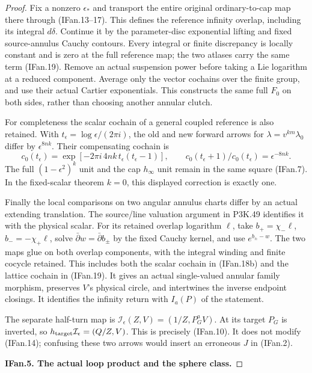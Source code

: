 \begin{proof}
Fix a nonzero \(\epsilon_*\) and transport the entire original
ordinary-to-cap map there through (IFan.13--17). This defines the
reference infinity overlap, including its integral \(d\delta\).
Continue it by the parameter-disc exponential lifting and fixed
source-annulus Cauchy contours. Every integral or finite discrepancy
is locally constant and is zero at the full reference map; the two
atlases carry the same term (IFan.19). Remove an actual suspension
power before taking a Lie logarithm at a reduced component. Average
only the vector cochains over the finite group, and use their actual
Cartier exponentials. This constructs the same full \(F_0\) on both
sides, rather than choosing another annular clutch.

For completeness the scalar cochain of a general coupled reference
is also retained. With \(t_\epsilon=\log\epsilon/(2\pi i)\), the
old and new forward arrows for \(\lambda=v^{km}\lambda_0\) differ
by \(\epsilon^{8nk}\). Their compensating cochain is
\[
 c_0(t_\epsilon)=\exp[-2\pi i\,4nk\,t_\epsilon(t_\epsilon-1)],
 \qquad c_0(t_\epsilon+1)/c_0(t_\epsilon)=\epsilon^{-8nk}.
                                                               \tag{IFan.20}
\]
The full \((1-\epsilon^2)^k\) unit and the cap \(h_\infty\) unit
remain in the same square (IFan.7). In the fixed-scalar theorem
\(k=0\), this displayed correction is exactly one.

Finally the local comparisons on two angular annulus charts differ
by an actual extending translation. The source/line valuation
argument in P3K.49 identifies it with the physical scalar. For its
retained overlap logarithm \(\ell\), take
\(b_+=\chi_-\ell\), \(b_-=-\chi_+\ell\), solve
\(\bar\partial w=\bar\partial b_\pm\) by the fixed Cauchy kernel,
and use \(e^{b_\pm-w}\). The two maps glue on both overlap
components, with the integral winding and finite cocycle retained.
This includes both the scalar cochain in (IFan.18b) and the lattice
cochain in (IFan.19). It gives an actual single-valued annular family morphism, preserves
\(V\)'s physical circle, and intertwines the inverse endpoint
closings. It identifies the infinity return with \(I_a(P)\) of the
statement.

The separate half-turn map is
\(\mathcal I_\epsilon(Z,V)=(1/Z,P_G^aV)\). At its target
\(P_G\) is inverted, so \(h_{\rm target}\mathcal I_\epsilon=(Q/Z,V)\).
This is precisely (IFan.10). It does not modify (IFan.14); confusing
these two arrows would insert an erroneous \(J\) in (IFan.2).

\par\medskip\noindent\textbf{IFan.5. The actual loop product and the sphere class.}\par\nopagebreak[4]


\end{proof}
